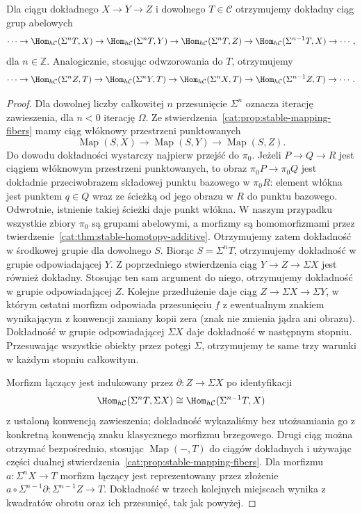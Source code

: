 \begin{stwierdzenie}\label{cat:prop:stable-long-exact-hom}
Dla ciągu dokładnego $X\to Y\to Z$ i dowolnego $T\in\mathcal C$ otrzymujemy dokładny ciąg grup abelowych
\[
 \cdots\to\Hom_{h\mathcal C}(\Sigma^n T,X)
 \to\Hom_{h\mathcal C}(\Sigma^n T,Y)
 \to\Hom_{h\mathcal C}(\Sigma^n T,Z)
 \to\Hom_{h\mathcal C}(\Sigma^{n-1}T,X)\to\cdots ,
\]
dla $n\in\mathbb Z$. Analogicznie, stosując odwzorowania do $T$, otrzymujemy
\[
 \cdots\to\Hom_{h\mathcal C}(\Sigma^n Z,T)
 \to\Hom_{h\mathcal C}(\Sigma^n Y,T)
 \to\Hom_{h\mathcal C}(\Sigma^n X,T)
 \to\Hom_{h\mathcal C}(\Sigma^{n-1}Z,T)\to\cdots .
\]
\end{stwierdzenie}
\begin{proof}
Dla dowolnej liczby całkowitej $n$ przesunięcie $\Sigma^n$ oznacza iterację zawieszenia, dla $n<0$ iterację $\Omega$. Ze stwierdzenia~\ref{cat:prop:stable-mapping-fibers} mamy ciąg włóknowy przestrzeni punktowanych
\[
 \operatorname{Map}(S,X)\longrightarrow\operatorname{Map}(S,Y)
 \longrightarrow\operatorname{Map}(S,Z).
\]
Do dowodu dokładności wystarczy najpierw przejść do $\pi_0$. Jeżeli $P\to Q\to R$ jest ciągiem włóknowym przestrzeni punktowanych, to obraz $\pi_0 P\to\pi_0 Q$ jest dokładnie przeciwobrazem składowej punktu bazowego w $\pi_0 R$: element włókna jest punktem $q\in Q$ wraz ze ścieżką od jego obrazu w $R$ do punktu bazowego. Odwrotnie, istnienie takiej ścieżki daje punkt włókna. W naszym przypadku wszystkie zbiory $\pi_0$ są grupami abelowymi, a morfizmy są homomorfizmami przez twierdzenie~\ref{cat:thm:stable-homotopy-additive}. Otrzymujemy zatem dokładność w środkowej grupie dla dowolnego $S$. Biorąc $S=\Sigma^nT$, otrzymujemy dokładność w grupie odpowiadającej $Y$. Z poprzedniego stwierdzenia ciąg $Y\to Z\to\Sigma X$ jest również dokładny. Stosując ten sam argument do niego, otrzymujemy dokładność w grupie odpowiadającej $Z$. Kolejne przedłużenie daje ciąg $Z\to\Sigma X\to\Sigma Y$, w którym ostatni morfizm odpowiada przesunięciu $f$ z ewentualnym znakiem wynikającym z konwencji zamiany kopii zera (znak nie zmienia jądra ani obrazu). Dokładność w grupie odpowiadającej $\Sigma X$ daje dokładność w następnym stopniu. Przesuwając wszystkie obiekty przez potęgi $\Sigma$, otrzymujemy te same trzy warunki w każdym stopniu całkowitym.

Morfizm łączący jest indukowany przez $\partial:Z\to\Sigma X$ po identyfikacji
\[
 \Hom_{h\mathcal C}(\Sigma^nT,\Sigma X)
 \cong\Hom_{h\mathcal C}(\Sigma^{n-1}T,X)
\]
z ustaloną konwencją zawieszenia; dokładność wykazaliśmy bez utożsamiania go z konkretną konwencją znaku klasycznego morfizmu brzegowego. Drugi ciąg można otrzymać bezpośrednio, stosując $\operatorname{Map}(-,T)$ do ciągów dokładnych i używając części dualnej stwierdzenia~\ref{cat:prop:stable-mapping-fibers}. Dla morfizmu $a:\Sigma^n X\to T$ morfizm łączący jest reprezentowany przez złożenie $a\circ\Sigma^{n-1}\partial:\Sigma^{n-1}Z\to T$. Dokładność w trzech kolejnych miejscach wynika z kwadratów obrotu oraz ich przesunięć, tak jak powyżej.
\end{proof}

